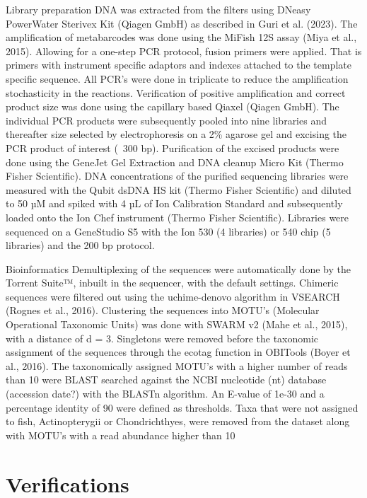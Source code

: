 \documentclass[12pt]{article}
\begin{document}
Library preparation
DNA was extracted from the filters using DNeasy PowerWater Sterivex Kit (Qiagen GmbH) as described in Guri et al. (2023). The amplification of metabarcodes was done using the MiFish 12S assay (Miya et al., 2015). Allowing for a one-step PCR protocol, fusion primers were applied. That is primers with instrument specific adaptors and indexes attached to the template specific sequence. All PCR’s were done in triplicate to reduce the amplification stochasticity in the reactions. Verification of positive amplification and correct product size was done using the capillary based Qiaxel (Qiagen GmbH). The individual PCR products were subsequently pooled into nine libraries and thereafter size selected by electrophoresis on a 2\% agarose gel and excising the PCR product of interest (~300 bp). Purification of the excised products were done using the GeneJet Gel Extraction and DNA cleanup Micro Kit (Thermo Fisher Scientific). DNA concentrations of the purified sequencing libraries were measured with the Qubit dsDNA HS kit (Thermo Fisher Scientific) and diluted to 50 µM and spiked with 4 µL of Ion Calibration Standard and subsequently loaded onto the Ion Chef instrument (Thermo Fisher Scientific). Libraries were sequenced on a GeneStudio S5 with the Ion 530 (4 libraries) or 540 chip (5 libraries) and the 200 bp protocol.

Bioinformatics
Demultiplexing of the sequences were automatically done by the Torrent Suite™, inbuilt in the sequencer, with the default settings. Chimeric sequences were filtered out using the uchime-denovo algorithm in VSEARCH (Rognes et al., 2016). Clustering the sequences into MOTU’s (Molecular Operational Taxonomic Units) was done with SWARM v2 (Mahe et al., 2015), with a distance of d = 3. Singletons were removed before the taxonomic assignment of the sequences through the ecotag  function in OBITools (Boyer et al., 2016). The taxonomically assigned MOTU’s with a higher number of reads than 10 were BLAST searched against the NCBI nucleotide (nt) database (accession date?) with the BLASTn algorithm. An E-value of 1e-30 and a percentage identity of 90 were defined as thresholds. Taxa that were not assigned to fish, Actinopterygii or Chondrichthyes, were removed from the dataset along with MOTU’s with a read abundance higher than 10%


\section{Verifications}
\label{sec:verify}
\end{document}
